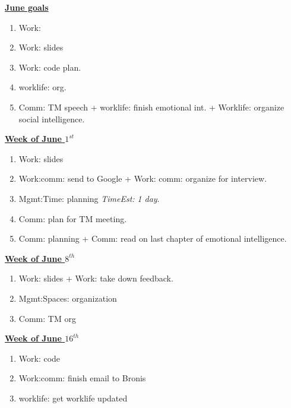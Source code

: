 \documentclass[serif, mathserif, final]{beamer}
\newcommand{\te}[1]{\textit{TimeEst:} \textit{#1}}
\begin{document}
\begin{frame}{}
\begin{columns}
\begin{column}{0.5\linewidth}
\begin{block}{\underline{\textbf{June goals}}} 
\begin{enumerate} 
\item \small Work: 
  \small \item \small Work: slides 
  \small \item \small Work: code plan. 
  \item \small worklife: org. 
  \item \small Comm: TM speech + worklife: finish emotional int. +
    Worklife: organize social intelligence. 
\end{enumerate}
\end{block}

\begin{block}{\small \underline{\textbf{Week of June $1^{st}$}}}
\begin{enumerate}
\tiny \item \tiny Work: slides 
\item \tiny Work:comm: send to Google + Work: comm: organize for interview.
\item \tiny Mgmt:Time: planning \te{1 day}. 
\item \tiny Comm: plan for TM meeting.
\item \tiny Comm: planning + Comm: read on last chapter of emotional intelligence. 
\end{enumerate}
\end{block}


\begin{block}{\small \underline{\textbf{Week of June $8^{th}$}}}
\begin{enumerate}
\tiny \item \tiny Work: slides + Work: take down feedback. 
\item \tiny Mgmt:Spaces: organization
\item \tiny Comm: TM org 
\end{enumerate}
\end{block}

\begin{block}{\small \underline{\textbf{Week of June $16^{th}$}}}
\begin{enumerate}
\tiny \item \tiny Work: code
\item \tiny Work:comm: finish email to Bronis
\item \tiny worklife: get worklife updated 


\end{enumerate}
\end{block}
\end{column}
\end{columns}
\end{frame}
\end{document}
